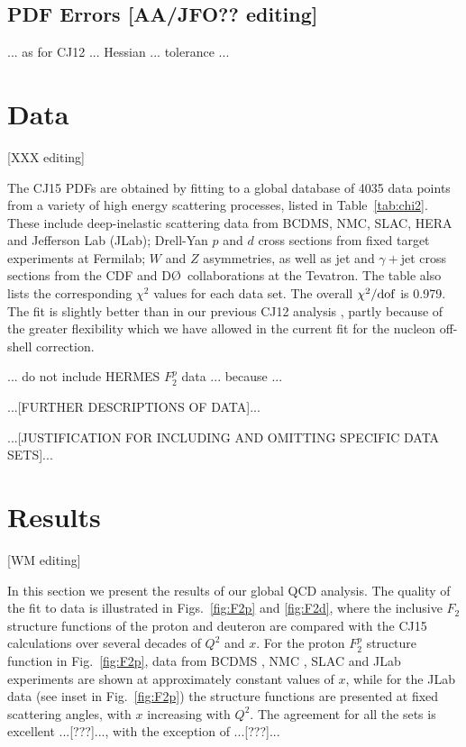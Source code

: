 \documentclass[aps,prd,amsmath,preprint]{revtex4}
\begin{document}
\subsection{PDF Errors {\color{red} [AA/JFO?? editing]}}
\label{ssec:errors}

... as for CJ12 ... Hessian ... tolerance ...



\section{Data} {\color{red} [XXX editing]}
\label{sec:data}

The CJ15 PDFs are obtained by fitting to a global database of 4035
data points from a variety of high energy scattering processes,
listed in Table~\ref{tab:chi2}.
These include
  deep-inelastic scattering data from BCDMS, NMC, SLAC, HERA and
Jefferson Lab (JLab);
  Drell-Yan $p$ and $d$ cross sections from fixed target experiments
at Fermilab;
  $W$ and $Z$ asymmetries, as well as jet and $\gamma+$jet cross
sections from the CDF and D\O\ collaborations at the Tevatron.
%
The table also lists the corresponding $\chi^2$ values for each
data set.  The overall $\chi^2/{\rm dof}$ is 0.979.
The fit is slightly better than in our previous CJ12 analysis
\cite{CJ12}, partly because of the greater flexibility which
we have allowed in the current fit for the nucleon off-shell
correction.


... do not include HERMES $F_2^p$ data ... because ...


{\color{red} ...[FURTHER DESCRIPTIONS OF DATA]...

...[JUSTIFICATION FOR INCLUDING AND OMITTING SPECIFIC DATA SETS]...}


\section{Results} {\color{red} [WM editing]}
\label{sec:results}

In this section we present the results of our global QCD analysis.
The quality of the fit to data is illustrated in Figs.~\ref{fig:F2p}
and \ref{fig:F2d}, where the inclusive $F_2$ structure functions
of the proton and deuteron are compared with the CJ15 calculations
over several decades of $Q^2$ and $x$.
%
%
For the proton $F_2^p$ structure function in Fig.~\ref{fig:F2p},
data from BCDMS \cite{BCDMS}, NMC \cite{NMCp}, SLAC \cite{SLAC}
and JLab \cite{Malace} experiments are shown at approximately
constant values of $x$, while for the JLab data (see inset in
Fig.~\ref{fig:F2p}) the structure functions are presented at fixed
scattering angles, with $x$ increasing with $Q^2$.
The agreement for all the sets is excellent ...[???]...,
with the exception of ...[???]...
\end{document}
